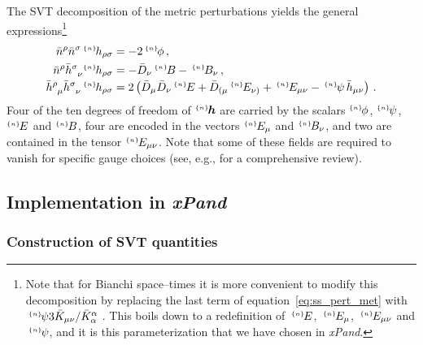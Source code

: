 \documentclass[notitlepage,onecolumn,floatfix,preprintnumbers,aps,prd,showpacs,nofootinbib,amsmath,amssymb,amsfonts]{revtex4-1}
\newcommand{\<}{\langle}
\renewcommand{\>}{\rangle}
\newcommand{\xPand}{{\em \lowercase{x}P\lowercase{and}}}
\newcommand{\pert}[2]{{}^{\mbox{\,\tiny $\{#1\}\!$}}{#2}}
\begin{document}
The SVT decomposition of the metric perturbations yields the general expressions\footnote{%
%
Note that for Bianchi space--times it is more convenient to modify this decomposition by replacing the last term of equation~\eqref{eq:ss_pert_met} with 
$\pert{n}{\psi} 3 \bar K_{\mu \nu} / \bar K^\alpha_\alpha$ \cite{Pitrou:2008gk}. This boils down to a redefinition of $\pert{n}{E}$, $\pert{n}{E_\mu}$,
$\pert{n}{E_{\mu \nu}}$ and $\pert{n}{\psi}$, and it is this parameterization that we have chosen in \textit{xPand}.
%
} 
\begin{align}
	\bar n^\rho \bar n^\sigma \pert{n}{h_{\rho \sigma}} 
		& = -2 \pert{n}{\phi} \, , 
		\label{eq:tt_pert_met} \\ 
	\bar n^\rho \bar h^{\sigma}_{\phantom{\sigma} \nu} \! \pert{n}{h_{\rho \sigma}} 
		& = - \bar D_\nu \pert{n}{B} - \pert{n}{B_\nu} \, , 
		\label{eq:ts_pert_met} \\
	\bar h^{\rho}_{\phantom{\rho} \mu} \bar h^{\sigma}_{\phantom{\sigma} \nu} \pert{n}{h_{\rho \sigma}} 
		& = 2 \left( \bar D_\mu \bar D_\nu \pert{n}{E} + \bar D_{(\mu} \pert{n}{E_{\nu)}} 
		+ \pert{n}{E_{\mu\nu}} - \pert{n}{\psi} \, \bar h_{\mu\nu} \right) \, .  
		\label{eq:ss_pert_met}
\end{align}
Four of the ten degrees of freedom of $\! \pert{n}{\bm h}$ are carried by the scalars 
$\! \pert{n}{\phi}$, $\! \pert{n}{\psi}$, $\! \pert{n}{E}$ and $\! \pert{n}{B}$,
four are encoded in the vectors $\! \pert{n}{E_\mu}$ and $\! \pert{n}{B_\nu}$, 
and two are contained in the tensor $\! \pert{n}{E_{\mu \nu}}$.
Note that some of these fields are required to vanish for specific gauge choices 
(see, e.g., \cite{Malik:2008im} for a comprehensive review). 

\subsection{Implementation in \xPand}

\subsubsection{Construction of SVT quantities}
\end{document}
